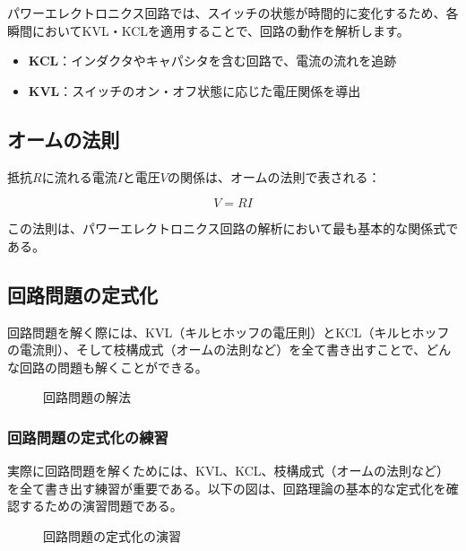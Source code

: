 パワーエレクトロニクス回路では、スイッチの状態が時間的に変化するため、各瞬間においてKVL・KCLを適用することで、回路の動作を解析します。

\begin{itemize}
\item \textbf{KCL}：インダクタやキャパシタを含む回路で、電流の流れを追跡
\item \textbf{KVL}：スイッチのオン・オフ状態に応じた電圧関係を導出
\end{itemize}

\subsection{オームの法則}

抵抗$R$に流れる電流$I$と電圧$V$の関係は、オームの法則で表される：

\begin{equation}
V = RI
\end{equation}

この法則は、パワーエレクトロニクス回路の解析において最も基本的な関係式である。

\subsection{回路問題の定式化}

回路問題を解く際には、KVL（キルヒホッフの電圧則）とKCL（キルヒホッフの電流則）、そして枝構成式（オームの法則など）を全て書き出すことで、どんな回路の問題も解くことができる。

\begin{figure}[H]
\centering
{}
\caption{回路問題の解法}
\label{fig:circuit_solution}
\end{figure}

\subsubsection{回路問題の定式化の練習}

実際に回路問題を解くためには、KVL、KCL、枝構成式（オームの法則など）を全て書き出す練習が重要である。以下の図は、回路理論の基本的な定式化を確認するための演習問題である。

\begin{figure}[H]
\centering
{}
\caption{回路問題の定式化の演習}
\label{fig:circuit_formulation}
\end{figure}

